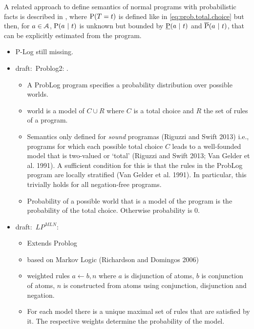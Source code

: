 \documentclass{article}
\newcommand{\at}[1]{\ensuremath{\!\del{#1}}}
\newcommand{\cla}[1]{\ensuremath{{\cal #1}}}
\newcommand{\prfunc}{\ensuremath{\mathrm{P}}}
\newcommand{\pr}[1]{\ensuremath{\prfunc\at{#1}}}
\newcommand{\given}{\ensuremath{~\middle|~}}
\newcommand{\ATOMSset}{\ensuremath{\cla{A}}}
\newcommand{\franc}[1]{{\color{green!30!black}#1}}
\newcommand{\bruno}{\color{red!60!black}}
\begin{document}
%
A related approach to define semantics of normal programs with
probabilistic facts is described in \cite{cozman2020joy}, where
$\pr{T = t}$ is defined like in \cref{eq:prob.total.choice} but then,
for $a \in \ATOMSset$, $\pr{a \given t}$ is unknown but bounded by
$\underbar{\prfunc}\at{a \given t}$ and
$\overline{\prfunc}\at{a \given t}$, that can be explicitly estimated
from the program.
%

%

\begin{itemize}
	\item P-Log \franc{still missing}.
	\item \franc{draft:}~Problog2: \cite{fierens2015inference,verreet2022inference}.  
	\begin{itemize}
	\item A ProbLog program specifies a probability distribution over
	  possible worlds.
	\item world is a model of $C \cup R$ where $C$ is a total choice
	  and $R$ the set of rules of a program.
	\item Semantics only defined for \textit{sound} programas {\bruno
		(Riguzzi and Swift 2013)} i.e., programs for which each
	  possible total choice $C$ leads to a well-founded model that is
	  two-valued or `total' {\bruno (Riguzzi and Swift 2013; Van
		Gelder et al. 1991)}.  A sufficient condition for this is that
	  the rules in the ProbLog program are locally stratified {\bruno
		(Van Gelder et al. 1991)}.  In particular, this trivially
	  holds for all negation-free programs.
	\item Probability of a possible world that is a model of the
	  program is the probability of the total choice.  Otherwise
	  probability is 0.
	\end{itemize}
  \item \franc{draft:}~$LP^{MLN}$: \cite{lee2016weighted,lee2017lpmln}
	\begin{itemize}
	\item Extends Problog
	\item based on Markov Logic (Richardson and Domingos 2006)
	\item weighted rules $a \leftarrow b, n$ where $a$ is disjunction
	  of atoms, $b$ is conjunction of atoms, $n$ is constructed from
	  atoms using conjunction, disjunction and negation.
	\item For each model there is a unique maximal set of rules that
	  are satisfied by it.  The respective weights determine the
	  probability of the model.
	\end{itemize}
\end{itemize}
%
\end{document}
